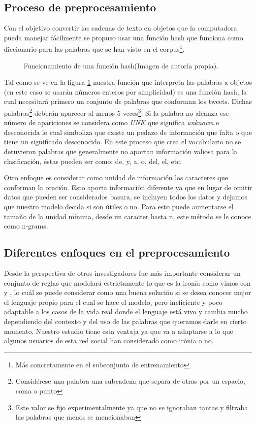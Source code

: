 \subsection{Proceso de preprocesamiento}
\par Con el objetivo convertir las cadenas de texto en objetos que la computadora pueda manejar fácilmente se propuso usar una función hash que funciona como diccionario para las palabras que se han visto en el corpus\footnote{Más concretamente en el subconjunto de entrenamiento}.
\begin{figure}[h!]
	\centering
	
	\caption{Funcionamiento de una función hash(Imagen de autoría propia).}
	\label{fig:funcionHash}
\end{figure}
\par Tal como se ve en la figura \ref{fig:funcionHash} nuestra función que interpreta las palabras a objetos (en este caso se usarán números enteros por simplicidad) es una función hash, la cual necesitará primero un conjunto de palabras que conforman los tweets. Dichas palabras\footnote{Considérese
	una palabra una subcadena que separa de otras por un espacio, coma o punto} deberán aparecer al menos 5 veces\footnote{Este valor se fijo experimentalmente ya que no se ignoraban tantas y filtraba las palabras que menos se mencionaban}. Si la palabra no alcanza ese número de apariciones se considera como \textit{UNK} que significa \textit{unknown} o desconocida lo cual simboliza que existe un pedazo de información que falta o que tiene un significado desconocido. En este proceso que crea el vocabulario no se detuvieron palabras que generalmente no aportan información valiosa para la clasificación, éstas pueden ser como: de, y, a, o, del, el, etc.

\par Otro enfoque es considerar como unidad de información los caracteres que conforman la oración. Esto aporta información diferente ya que en lugar de omitir datos que pueden ser considerados basura, se incluyen todos los datos y dejamos que nuestro modelo decida si son útiles o no. Para esto puede aumentarse el tamaño de la unidad mínima, desde un caracter hasta n, este método se le conoce como n-grams.

\subsection{Diferentes enfoques en el preprocesamiento}
\par Desde la perspectiva de otros investigadores fue más importante considerar un conjunto de reglas que modelará estrictamente lo que es la ironía como vimos con \cite{utsumi1996unified} y \cite{kong2011formalization}, lo cuál se puede considerar como una buena solución si se desea conocer mejor el lenguaje propio para el cual se  hace el modelo, pero ineficiente y poco adaptable a los casos de la vida real donde el lenguaje está vivo y cambia mucho dependiendo del contexto y del uso de las palabras que queramos darle en cierto momento. Nuestro estudio tiene esta ventaja ya que va a adaptarse a lo que algunos usuarios de esta red social han considerado como irónia o no.

